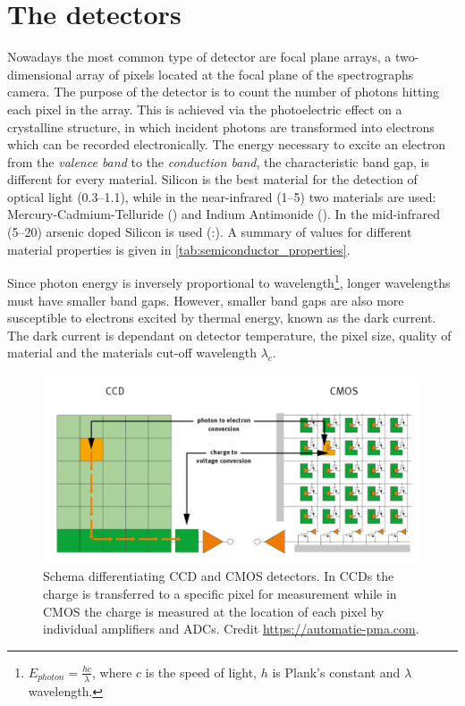 \section{The detectors}
\label{subsec:nir_detectors}
Nowadays the most common type of detector are focal plane arrays, a two-dimensional array of pixels located at the focal plane of the spectrographs camera.
The purpose of the detector is to count the number of photons hitting each pixel in the array.
This is achieved via the photoelectric effect on a crystalline structure, in which incident photons are transformed into electrons which can be recorded electronically.
The energy necessary to excite an electron from the \emph{valence band} to the \emph{conduction band}, the characteristic band gap, is different for every material.
Silicon is the best material for the detection of optical light (0.3--1.1\um), while in the near-infrared (1--5\um) two materials are used: {Mercury-Cadmium-Telluride} () and {Indium Antimonide} ().
In the mid-infrared (5--20\um) arsenic doped Silicon is used (:).
A summary of values for different material properties is given in \cref{tab:semiconductor_properties}.

Since photon energy is inversely proportional to wavelength\footnote{\(E_{photon} = \frac{h c}{\lambda}\), where \(c\) is the speed of light, \(h\) is Plank's constant and \(\lambda\) wavelength.}, longer wavelengths must have smaller band gaps.
However, smaller band gaps are also more susceptible to electrons excited by thermal energy, known as the dark current.
The dark current is dependant on detector temperature, the pixel size, quality of material and the materials cut-off wavelength \(\lambda_{c}\).




\begin{figure}
    \centering
    \includegraphics[width=0.8\linewidth]{figures/spectroscopy/CMOS-vs-CCD-schema}
    \caption[Schema differentiating {CCD} and {CMOS} detectors.]{Schema differentiating {CCD} and {CMOS} detectors.
    In {CCDs} the charge is transferred to a specific pixel for measurement while in {CMOS} the charge is measured at the location of each pixel by individual amplifiers and {ADCs}.
    Credit \href{https://automatie-pma.com/pma/innovatie-en-technologie-pma/cmos-vervangt-steeds-meer-hoogwaardige-ccd-toepassingen/}{https://automatie-pma.com}.}
    \label{fig:cmos-vs-ccd-schema}
\end{figure}

